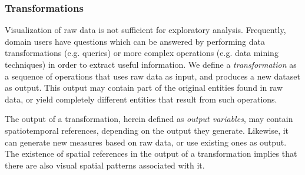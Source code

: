 \documentclass[]{interact}
\theoremstyle{plain}%
\newtheorem{proposition}[theorem]{Proposition}
\theoremstyle{definition}
\theoremstyle{remark}
\theoremstyle{definition}
\begin{document}
\subsubsection{Transformations}\label{sec:analyzer}

Visualization of raw data is not sufficient for exploratory analysis. Frequently, domain users have questions which can be answered by performing data transformations (e.g. queries) or more complex operations (e.g. data mining techniques) in order to extract useful information. We define a \emph{transformation} as a sequence of operations that uses raw data as input, and produces a new dataset as output. This output may contain part of the original entities found in raw data, or yield completely different entities that result from such operations.



The output of a transformation, herein defined as \emph{output variables}, may contain spatiotemporal references, depending on the output they generate. Likewise, it can generate new measures based on raw data, or use existing ones as output. The existence of spatial references in the output of a transformation implies that there are also visual spatial patterns associated with it. 
%
\end{document}
